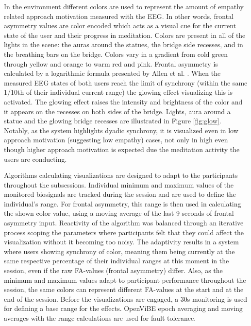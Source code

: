 \documentclass[manuscript, review = false, screen]{acmart}
\begin{document}
In the environment different colors are used to represent the amount of empathy related approach motivation measured with the EEG. In other words, frontal asymmetry values are color encoded which acts as a visual cue for the current state of the user and their progress in meditation. Colors are present in all of the lights in the scene: the auras around the statues, the bridge side recesses, and in the breathing bars on the bridge. Colors vary in a gradient from cold green through yellow and orange to warm red and pink. Frontal asymmetry is calculated by a logarithmic formula presented by Allen et al. \cite{Allen2004}. When the measured EEG states of both users reach the limit of synchrony (within the same 1/10th of their individual current range) the glowing effect visualizing this is activated. The glowing effect raises the intensity and brightness of the color and it appears on the recesses on both sides of the bridge. Lights, aura around a statue and the glowing bridge recesses are illustrated in Figure \ref{fig:glow}. Notably, as the system highlights dyadic synchrony, it is visualized even in low approach motivation (suggesting low empathy) cases, not only in high even though higher approach motivation is expected due the meditation activity the users are conducting.

Algorithms calculating visualizations are designed to adapt to the participants throughout the subsessions. Individual minimum and maximum values of the monitored biosignals are tracked during the session and are used to define the individual's range. For frontal asymmetry, this range is then used in calculating the shown color value, using a moving average of the last 9 seconds of frontal asymmetry input. Reactivity of the algorithm was balanced through an iterative process scoping the parameters where participants felt that they could affect the visualization without it becoming too noisy. The adaptivity results in a system where users showing synchrony of color, meaning them being currently at the same respective percentage of their individual ranges at this moment in the session, even if the raw FA-values (frontal asymmetry) differ. Also, as the minimum and maximum values adapt to participant performance throughout the session, the same colors can represent different FA-values at the start and at the end of the session. Before the visualizations are engaged, a 30s monitoring is used for defining a base range for the effects. OpenViBE epoch averaging and moving averages with the range calculations are used for fault tolerance. 
\end{document}
